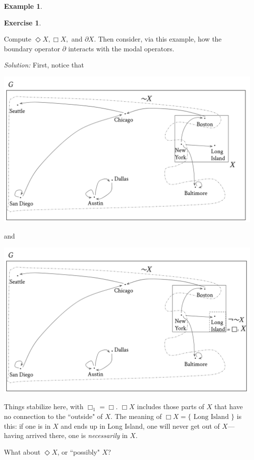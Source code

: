 \documentclass[a4paper]{book}
\theoremstyle{definition}
\newtheorem{example}{Example}[section]
\theoremstyle{definition}
\theoremstyle{definition}
\theoremstyle{theorem}
\theoremstyle{definition}
\newtheorem{exercise}{Exercise}[section]
\begin{document}
\begin{example}
\begin{exercise}
\begin{center}
	\end{center}
Compute $\Diamond X, \Box X,$ and $\partial X$. Then consider, via this example, how the boundary operator $\partial$ interacts with the modal operators. 
\end{exercise} \par \noindent 
\textit{Solution:} First, notice that 
	\begin{center}
		\includegraphics*[scale=0.2]{RoutesGraph2.png}
	\end{center}
and 
	\begin{center}
		\includegraphics*[scale=0.2]{RoutesGraph3.png}
	\end{center}
	Things stabilize here, with $\Box_1 = \Box$. $\Box X$ includes those parts of $X$ that have no connection to the ``outside" of $X$. The meaning of $\Box X = \{\text{ Long Island }\}$ is this: if one is in $X$ and ends up in Long Island, one will never get out of $X$---having arrived there, one is \textit{necessarily} in $X$. \par 
	What about $\Diamond X$, or ``possibly" $X$?   

\end{example}
\end{document}
